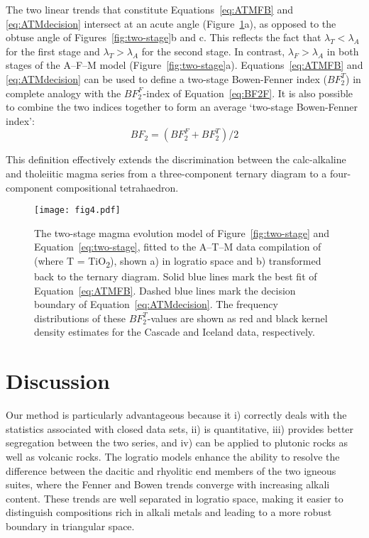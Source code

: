\documentclass{article}
\begin{document}
The two linear trends that constitute Equations~\ref{eq:ATMFB} and
\ref{eq:ATMdecision} intersect at an acute angle
(Figure~\ref{fig:ATMfit}a), as opposed to the obtuse angle of
Figures~\ref{fig:two-stage}b and c. This reflects the fact that
$\lambda_T<\lambda_A$ for the first stage and $\lambda_T>\lambda_A$
for the second stage. In contrast, $\lambda_F>\lambda_A$ in both
stages of the A--F--M model
(Figure~\ref{fig:two-stage}a). Equations~\ref{eq:ATMFB} and
\ref{eq:ATMdecision} can be used to define a two-stage Bowen-Fenner
index ($BF_2^T$) in complete analogy with the $BF_2^F$-index of
Equation~\ref{eq:BF2F}. It is also possible to combine the two indices
together to form an average `two-stage Bowen-Fenner index':
\begin{equation}
  BF_2 = (BF_2^F+BF_2^T)/2
\end{equation}

This definition effectively extends the discrimination between the
calc-alkaline and tholeiitic magma series from a three-component
ternary diagram to a four-component compositional
tetrahaedron.\medskip

\begin{figure}[!ht]
  \centering
  \texttt{[image: fig4.pdf]}
  \caption{ The two-stage magma evolution model of
    Figure~\ref{fig:two-stage} and Equation~\ref{eq:two-stage}, fitted
    to the A--T--M data compilation of \citet{rollinson2021} (where T
    = TiO\textsubscript{2}), shown a) in logratio space and b)
    transformed back to the ternary diagram. Solid blue lines mark the
    best fit of Equation~\ref{eq:ATMFB}. Dashed blue lines mark the
    decision boundary of Equation~\ref{eq:ATMdecision}. The frequency
    distributions of these $BF_2^T$-values are shown as red and black
    kernel density estimates for the Cascade and Iceland data,
    respectively.}
  \label{fig:ATMfit}
\end{figure}

\section{Discussion}

Our method is particularly advantageous because it i) correctly deals
with the statistics associated with closed data sets, ii) is
quantitative, iii) provides better segregation between the two series,
and iv) can be applied to plutonic rocks as well as volcanic
rocks. The logratio models enhance the ability to resolve the
difference between the dacitic and rhyolitic end members of the two
igneous suites, where the Fenner and Bowen trends converge with
increasing alkali content. These trends are well separated in logratio
space, making it easier to distinguish compositions rich in alkali
metals and leading to a more robust boundary in triangular
space.\medskip
\end{document}
